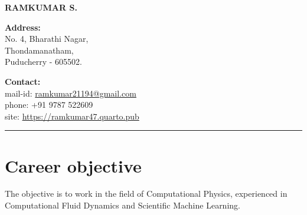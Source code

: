 \documentclass[11pt]{article}
\title{}
\begin{document}
\begin{center}
	\Large  \textbf{RAMKUMAR S.}
\end{center}

\vspace{0.25cm}

\begin{minipage}[t]{0.60\linewidth}
	\textbf{Address:}\\
	No. 4, Bharathi Nagar, \\
	Thondamanatham, \\
	Puducherry - 605502.
\end{minipage}
\begin{minipage}[t]{0.45\linewidth}
	\textbf{Contact:}\\
	mail-id: \href{mailto: ramkumar21194@gmail.com}{ramkumar21194@gmail.com}\\
	phone: +91 9787 522609 \\
    site: \href{https://ramkumar47.quarto.pub}{https://ramkumar47.quarto.pub}
\end{minipage}

\vspace{1cm}

\hrule

\section{Career objective}
\qquad The objective is to work in the field of Computational Physics, experienced in
Computational Fluid Dynamics and Scientific Machine Learning.




\end{document}
